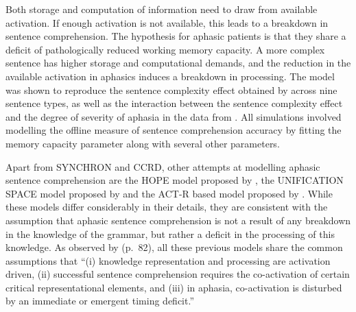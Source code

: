 \documentclass{cambridge7A}\usepackage[]{graphicx}\usepackage[]{color}
\begin{document}
Both storage and computation of information need to draw from available activation. If enough activation is not available, this leads to a breakdown in sentence comprehension. The hypothesis for aphasic patients is that they share a deficit of pathologically reduced working memory capacity. A more complex sentence has higher storage and computational demands, and the reduction in the available activation in aphasics induces a breakdown in processing. The model was shown to reproduce the sentence complexity effect obtained by \cite{Caplan-Et-Al-1985} across nine sentence types, as well as the interaction between the sentence complexity effect and the degree of severity of aphasia in the data from \cite{Kolk-vanGrunsven-1985}. All simulations involved modelling the offline measure of sentence comprehension accuracy by fitting the memory capacity parameter along with several other parameters.

Apart from SYNCHRON and CCRD, other attempts at modelling aphasic sentence comprehension are the HOPE model proposed by \cite{Gigley-1986}, the  UNIFICATION SPACE model proposed by \cite{Kempen-Vosse-1989,vossekempen2000} and the ACT-R based model proposed by \cite{Crescentini-Stocco-2005}. While these models differ considerably in their details, they are consistent with the assumption that aphasic sentence comprehension is not a result of any breakdown in the knowledge of the grammar, but rather a deficit in the processing of this knowledge. As observed by \cite{Haarmann-EtAl-1997} (p.\ 82),  
all these previous models share the common assumptions that ``(i) knowledge representation and processing are activation driven, (ii) successful sentence comprehension requires the co-activation of certain critical representational elements, and (iii) in aphasia, co-activation is disturbed by an immediate or emergent timing deficit.'' 
\end{document}
